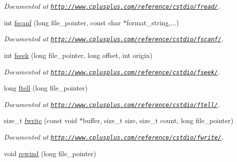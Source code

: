 \begin{DoxyCompactItemize}
\begin{DoxyCompactList}\small\item\em Documented at \href{http://www.cplusplus.com/reference/cstdio/fread/}{\tt http\-://www.\-cplusplus.\-com/reference/cstdio/fread/}. \end{DoxyCompactList}\item 
\hypertarget{group__file_gafcf45ec2dfbe6d412cbe8bf9e358f94a}{int \hyperlink{group__file_gafcf45ec2dfbe6d412cbe8bf9e358f94a}{fscanf} (long file\-\_\-pointer, const char $\ast$format\-\_\-string,...)}\label{group__file_gafcf45ec2dfbe6d412cbe8bf9e358f94a}

\begin{DoxyCompactList}\small\item\em Documented at \href{http://www.cplusplus.com/reference/cstdio/fscanf/}{\tt http\-://www.\-cplusplus.\-com/reference/cstdio/fscanf/}. \end{DoxyCompactList}\item 
\hypertarget{group__file_gaf1a19cac0fb61afd6beea6b05c4ffb67}{int \hyperlink{group__file_gaf1a19cac0fb61afd6beea6b05c4ffb67}{fseek} (long file\-\_\-pointer, long offset, int origin)}\label{group__file_gaf1a19cac0fb61afd6beea6b05c4ffb67}

\begin{DoxyCompactList}\small\item\em Documented at \href{http://www.cplusplus.com/reference/cstdio/fseek/}{\tt http\-://www.\-cplusplus.\-com/reference/cstdio/fseek/}. \end{DoxyCompactList}\item 
\hypertarget{group__file_gaad594160bcd06764f62585293162e44d}{long \hyperlink{group__file_gaad594160bcd06764f62585293162e44d}{ftell} (long file\-\_\-pointer)}\label{group__file_gaad594160bcd06764f62585293162e44d}

\begin{DoxyCompactList}\small\item\em Documented at \href{http://www.cplusplus.com/reference/cstdio/ftell/}{\tt http\-://www.\-cplusplus.\-com/reference/cstdio/ftell/}. \end{DoxyCompactList}\item 
\hypertarget{group__file_ga9ec52e116d0313bd32502741aa77267d}{size\-\_\-t \hyperlink{group__file_ga9ec52e116d0313bd32502741aa77267d}{fwrite} (const void $\ast$buffer, size\-\_\-t size, size\-\_\-t count, long file\-\_\-pointer)}\label{group__file_ga9ec52e116d0313bd32502741aa77267d}

\begin{DoxyCompactList}\small\item\em Documented at \href{http://www.cplusplus.com/reference/cstdio/fwrite/}{\tt http\-://www.\-cplusplus.\-com/reference/cstdio/fwrite/}. \end{DoxyCompactList}\item 
\hypertarget{group__file_ga7976044cb9a7657ba3e94883e65a2774}{void \hyperlink{group__file_ga7976044cb9a7657ba3e94883e65a2774}{rewind} (long file\-\_\-pointer)}\label{group__file_ga7976044cb9a7657ba3e94883e65a2774}


\end{DoxyCompactItemize}
